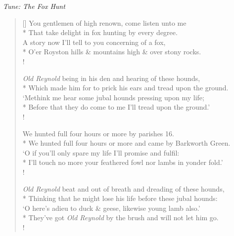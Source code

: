 \documentclass[MAIN]{subfiles}
\begin{document}
\begin{center}
\emph{Tune: The Fox Hunt}
\end{center}

\bigskip

\settowidth{\versewidth}{I'll touch no more your feathered fowl nor lambs in yonder fold.'}
\begin{verse}[\versewidth]
You gentlemen of high renown, come listen unto me\\*
That take delight in fox hunting by every degree.\\
A story now I'll tell to you concerning of a fox,\\*
O'er {\sc Royston} hills \& mountains high \& over stony rocks.\\!

\emph{Old Reynold} being in his den and hearing of these hounds,\\*
Which made him for to prick his ears and tread upon the ground.\\
`Methink me hear some jubal hounds pressing upon my life;\\*
Before that they do come to me I'll tread upon the ground.'\\!

We hunted full four hours or more by parishes 16.\\*
We hunted full four hours or more and came by {\sc Barkworth Green}.\\
`O if you'll only spare my life I'll promise and fulfil:\\*
I'll touch no more your feathered fowl nor lambs in yonder fold.'\\!

\emph{Old Reynold} beat and out of breath and dreading of these hounds,\\*
Thinking that he might lose his life before these jubal hounds:\\
`O here's adieu to duck \& geese, likewise young lamb also.'\\*
They've got \emph{Old Reynold} by the brush and will not let him go.\\!
\end{verse}
\end{document}
